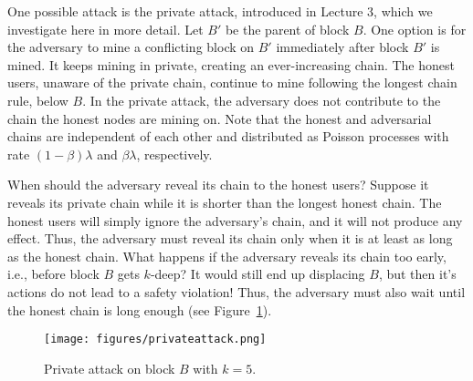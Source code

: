 \documentclass{article}
\begin{document}
One possible attack is the private attack, introduced in Lecture 3, which we investigate here in more detail. Let $B'$ be the parent of block $B$. One option is for the adversary to mine a conflicting block on $B'$ immediately after block $B'$ is mined. It keeps mining in private, creating an ever-increasing chain. The honest users, unaware of the private chain, continue to mine following the longest chain rule, below $B$. In the private attack, the adversary does not contribute to the chain the honest nodes are mining on. %
Note that the honest and adversarial chains are independent of each other and distributed as Poisson processes with rate $(1-\beta)\lambda$ and $\beta\lambda$, respectively. 

When should the adversary reveal its chain to the honest users? Suppose it reveals its private chain while it is shorter than the longest honest chain. The honest users will simply ignore the adversary's chain, and it will not produce any effect. Thus, the adversary must reveal its chain only when it is at least as long as the honest chain. What happens if the adversary reveals its chain too early, i.e., before block $B$ gets $k$-deep? It would still end up displacing $B$, but then it's actions do not lead to a safety violation! Thus, the adversary must also wait until the honest chain is long enough (see Figure~\ref{fig:privateattack}). 

 \begin{figure}
   \centering
     \texttt{[image: figures/privateattack.png]}
     \caption{Private attack on block $B$ with $k=5$.}
     \label{fig:privateattack}
 \end{figure}
\end{document}
